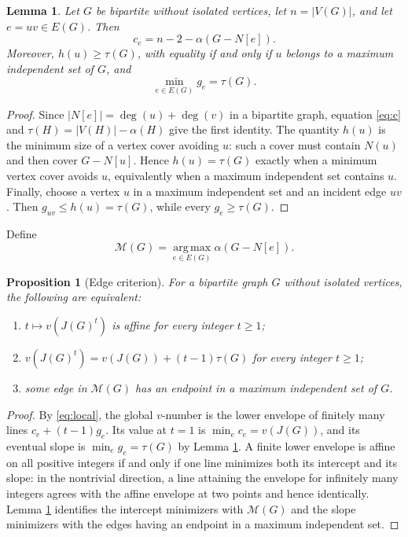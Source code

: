 \documentclass[11pt]{amsart}
\newtheorem{proposition}[theorem]{Proposition}
\newtheorem{lemma}[theorem]{Lemma}
\newcommand{\M}{\mathcal M}
\begin{document}
\begin{lemma}\label{lem:graph}
Let $G$ be bipartite without isolated vertices, let $n=|V(G)|$, and let
$e=uv\in E(G)$. Then
\[
  c_e=n-2-\alpha(G-N[e]).
\]
Moreover, $h(u)\geq\tau(G)$, with equality if and only if $u$ belongs to a
maximum independent set of $G$, and
\[
  \min_{e\in E(G)}g_e=\tau(G).
\]
\end{lemma}

\begin{proof}
Since $|N[e]|=\deg(u)+\deg(v)$ in a bipartite graph, equation \eqref{eq:c} and
$\tau(H)=|V(H)|-\alpha(H)$ give the first identity. The quantity $h(u)$ is the
minimum size of a vertex cover avoiding $u$: such a cover must contain $N(u)$
and then cover $G-N[u]$. Hence $h(u)=\tau(G)$ exactly when a minimum vertex
cover avoids $u$, equivalently when a maximum independent set contains $u$.
Finally, choose a vertex $u$ in a maximum independent set and an incident edge
$uv$. Then $g_{uv}\leq h(u)=\tau(G)$, while every $g_e\geq\tau(G)$.
\end{proof}

Define
\[
  \M(G)=\operatorname*{arg\,max}_{e\in E(G)}\alpha(G-N[e]).
\]

\begin{proposition}[Edge criterion]\label{prop:criterion}
For a bipartite graph $G$ without isolated vertices, the following are
equivalent:
\begin{enumerate}
  \item $t\mapsto v(J(G)^t)$ is affine for every integer $t\geq1$;
  \item $v(J(G)^t)=v(J(G))+(t-1)\tau(G)$ for every integer $t\geq1$;
  \item some edge in $\M(G)$ has an endpoint in a maximum independent set of
  $G$.
\end{enumerate}
\end{proposition}

\begin{proof}
By \eqref{eq:local}, the global $v$-number is the lower envelope of finitely many
lines $c_e+(t-1)g_e$. Its value at $t=1$ is $\min_e c_e=v(J(G))$, and its
eventual slope is $\min_e g_e=\tau(G)$ by Lemma \ref{lem:graph}. A finite lower
envelope is affine on all positive integers if and only if one line minimizes
both its intercept and its slope: in the nontrivial direction, a line attaining
the envelope for infinitely many integers agrees with the affine envelope at
two points and hence identically. Lemma \ref{lem:graph} identifies the
intercept minimizers with $\M(G)$ and the slope minimizers with the edges having
an endpoint in a maximum independent set.
\end{proof}
\end{document}
